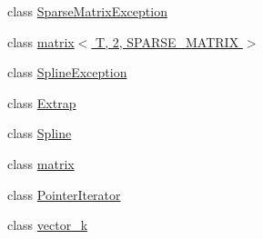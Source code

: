 \begin{DoxyCompactItemize}
class \hyperlink{classkeycpp_1_1_sparse_matrix_exception}{Sparse\-Matrix\-Exception}
\item 
class \hyperlink{classkeycpp_1_1matrix_3_01_t_00_012_00_01_s_p_a_r_s_e___m_a_t_r_i_x_01_4}{matrix$<$ T, 2, S\-P\-A\-R\-S\-E\-\_\-\-M\-A\-T\-R\-I\-X $>$}
\item 
class \hyperlink{classkeycpp_1_1_spline_exception}{Spline\-Exception}
\item 
class \hyperlink{classkeycpp_1_1_extrap}{Extrap}
\item 
class \hyperlink{classkeycpp_1_1_spline}{Spline}
\item 
class \hyperlink{classkeycpp_1_1matrix}{matrix}
\item 
class \hyperlink{classkeycpp_1_1_pointer_iterator}{Pointer\-Iterator}
\item 
class \hyperlink{classkeycpp_1_1vector__k}{vector\-\_\-k}
\end{DoxyCompactItemize}
